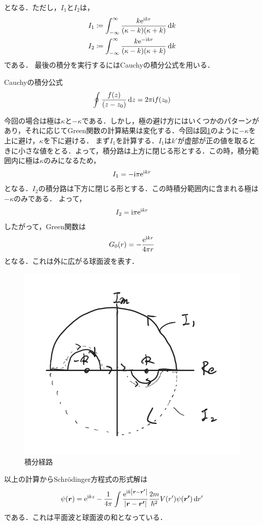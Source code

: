 \documentclass{report}
\begin{document}
    となる．ただし，$I_1$と$I_2$は，
    \begin{align}
      I_1 \coloneqq \int_{-\infty}^{\infty} \frac{k \mathrm{e}^{\mathrm{i} kr}}{(\kappa - k)(\kappa + k)} \dd{k}\\ 
      I_2 \coloneqq \int_{-\infty}^{\infty} \frac{k \mathrm{e}^{-\mathrm{i} kr}}{(\kappa - k)(\kappa + k)} \dd{k}
    \end{align}
    である．
    最後の積分を実行するにはCauchyの積分公式を用いる．
    \begin{itembox}[l]{Cauchyの積分公式}
      \begin{align}
        \oint \frac{f(z)}{(z-z_0)}\dd{z} = 2\pi \mathrm{i} f(z_0)
      \end{align}
    \end{itembox}
    今回の場合は極は$\kappa$と$-\kappa$である．しかし，極の避け方にはいくつかのパターンがあり，それに応じてGreen関数の計算結果は変化する．今回は図\ref{Integral}のように$-\kappa$を上に避け，$\kappa$を下に避ける．
    まず$I_1$を計算する．$I_1$は$k'$が虚部が正の値を取るときに小さな値をとる．よって，積分路は上方に閉じる形とする．この時，積分範囲内に極は$\kappa$のみになるため，
    \begin{align}
      I_1 = -\mathrm{i}\pi\mathrm{e}^{\mathrm{i} kr}
    \end{align}
    となる．$I_2$の積分路は下方に閉じる形とする．この時積分範囲内に含まれる極は$-\kappa$のみである．
    よって，
    \begin{align}
      I_2 = \mathrm{i}\pi\mathrm{e}^{\mathrm{i} kr}
    \end{align}
    したがって，Green関数は
    \begin{align}
      G_0(r) = -\frac{\mathrm{e}^{\mathrm{i} kr}}{4\pi r}
    \end{align}
    となる．これは外に広がる球面波を表す．
    \begin{figure}[H]
      \centering
      \includegraphics[width=0.7\columnwidth]{fig/IntegralGreen.pdf}
      \caption{積分経路}
      \label{Integral}
    \end{figure}
    以上の計算からSchrödinger方程式の形式解は
    \begin{align}
      \label{keishiki}
      \psi(\bm{r}) = \mathrm{e}^{\mathrm{i} kz} - \frac{1}{4\pi} \int \frac{\mathrm{e}^{\mathrm{i} k \abs{\bm{r} - \bm{r'}}}}{\abs{\bm{r} - \bm{r'}}} \frac{2m}{\hbar^2}V(r')\psi(\bm{r'}) \dd{r'}
    \end{align}
    である．これは平面波と球面波の和となっている．
\end{document}
